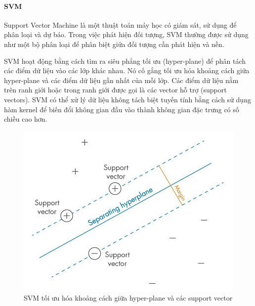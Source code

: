 \paragraph{SVM\\}
Support Vector Machine là một thuật toán máy học có giám sát, sử dụng để phân loại và dự báo. Trong việc phát hiện đối tượng, SVM thường được sử dụng như một bộ phân loại để phân biệt giữa đối tượng cần phát hiện và nền.

SVM hoạt động bằng cách tìm ra siêu phẳng tối ưu (hyper-plane) để phân tách các điểm dữ liệu vào các lớp khác nhau. Nó cố gắng tối ưu hóa khoảng cách giữa hyper-plane và các điểm dữ liệu gần nhất của mỗi lớp. Các điểm dữ liệu nằm trên ranh giới hoặc trong ranh giới được gọi là các vector hỗ trợ (support vectors). SVM có thể xử lý dữ liệu không tách biệt tuyến tính bằng cách sử dụng hàm kernel để biến đổi không gian đầu vào thành không gian đặc trưng có số chiều cao hơn.
\graphicspath{{figures/}}
\begin{figure}[h!]
  \centering
  \includegraphics[scale=0.35]{graphics/SVM.jpg}
  \caption{SVM tối ưu hóa khoảng cách giữa hyper-plane và các support vector}
\end{figure}

